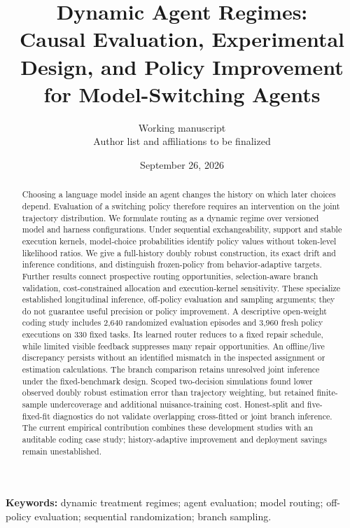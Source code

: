 \documentclass[11pt]{article}
\title{Dynamic Agent Regimes:\\Causal Evaluation, Experimental Design, and Policy Improvement for Model-Switching Agents}
\author{Working manuscript\\\small Author list and affiliations to be finalized}
\date{September 26, 2026}
\theoremstyle{definition}
\theoremstyle{remark}
\begin{document}
\maketitle
\begin{abstract}
Choosing a language model inside an agent changes the history on which later choices depend. Evaluation of a switching policy therefore requires an intervention on the joint trajectory distribution. We formulate routing as a dynamic regime over versioned model and harness configurations. Under sequential exchangeability, support and stable execution kernels, model-choice probabilities identify policy values without token-level likelihood ratios. We give a full-history doubly robust construction, its exact drift and inference conditions, and distinguish frozen-policy from behavior-adaptive targets. Further results connect prospective routing opportunities, selection-aware branch validation, cost-constrained allocation and execution-kernel sensitivity. These specialize established longitudinal inference, off-policy evaluation and sampling arguments; they do not guarantee useful precision or policy improvement. A descriptive open-weight coding study includes 2,640 randomized evaluation episodes and 3,960 fresh policy executions on 330 fixed tasks. Its learned router reduces to a fixed repair schedule, while limited visible feedback suppresses many repair opportunities. An offline/live discrepancy persists without an identified mismatch in the inspected assignment or estimation calculations. The branch comparison retains unresolved joint inference under the fixed-benchmark design. Scoped two-decision simulations found lower observed doubly robust estimation error than trajectory weighting, but retained finite-sample undercoverage and additional nuisance-training cost. Honest-split and five-fixed-fit diagnostics do not validate overlapping cross-fitted or joint branch inference. The current empirical contribution combines these development studies with an auditable coding case study; history-adaptive improvement and deployment savings remain unestablished.
\end{abstract}
\noindent\textbf{Keywords:} dynamic treatment regimes; agent evaluation; model routing; off-policy evaluation; sequential randomization; branch sampling.








\end{document}

